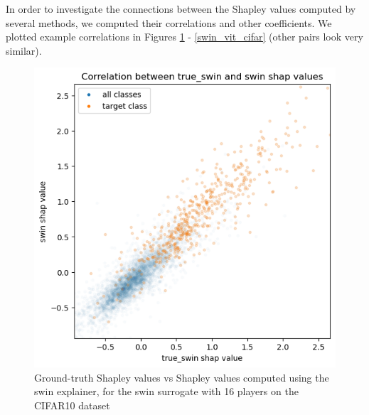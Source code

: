\documentclass[en]{pracamgr}
\begin{document}
In order to investigate the connections between the Shapley values computed by several methods, we computed their correlations and other coefficients. We plotted example correlations in Figures \ref{true_swin_swin_cifar} - \ref{swin_vit_cifar} (other pairs look very similar).



\begin{figure}[H]
\centering
\includegraphics[scale=0.5]{./images/true_swin_swin_cifar.png}
\caption{Ground-truth Shapley values vs Shapley values computed using the swin explainer, for the swin surrogate with 16 players on the CIFAR10 dataset}
\label{true_swin_swin_cifar}
\end{figure}
\end{document}
